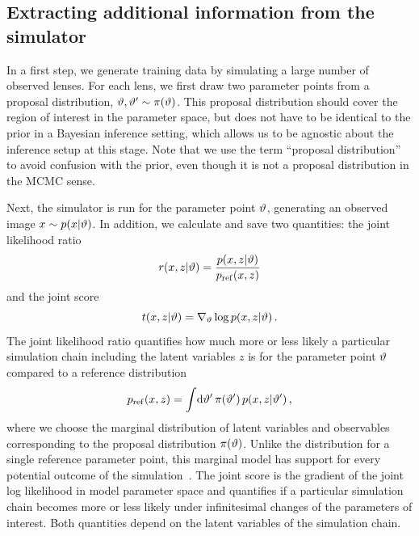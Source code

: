 \documentclass[twocolumn]{aastex63}
\begin{document}
\subsection{Extracting additional information from the simulator}
\label{sec:lfi-gold}

In a first step, we generate training data by simulating a large number of observed lenses. For each lens, we first draw two parameter points from a proposal distribution, $\vartheta, \vartheta' \sim \pi(\vartheta)$. This proposal distribution should cover the region of interest in the parameter space, but does not have to be identical to the prior in a Bayesian inference setting, which allows us to be agnostic about the inference setup at this stage. Note that we use the term ``proposal distribution'' to avoid confusion with the prior, even though it is not a proposal distribution in the MCMC sense.

Next, the simulator is run for the parameter point $\vartheta$, generating an observed image $x \sim p(x|\vartheta)$. In addition, we calculate and save two quantities: the joint likelihood ratio
%
\begin{equation}
  r(x,z | \stattheta) = \frac {p(x,z | \stattheta)} {p_\mathrm{ref}(x,z)}
\end{equation}
%
and the joint score
%
\begin{equation}
  t(x, z | \stattheta) = \nabla_{\stattheta} \log p(x,z | \stattheta) \,.
\end{equation}
%
The joint likelihood ratio quantifies how much more or less likely a particular simulation chain including the latent variables $z$ is for the parameter point $\vartheta$ compared to a reference distribution
%
\begin{equation}
  \pref(x,z) = \int\!\diff\stattheta' \, \pi(\stattheta') \, p(x,z | \stattheta') \,,
\end{equation}
%
where we choose the marginal distribution of latent variables and observables corresponding to the proposal distribution $\pi(\vartheta)$. Unlike the distribution for a single reference parameter point, this marginal model has support for every potential outcome of the simulation~\citep{Hermans:2019ioj}. The joint score is the gradient of the joint log likelihood in model parameter space and quantifies if a particular simulation chain becomes more or less likely under infinitesimal changes of the parameters of interest. Both quantities depend on the latent variables of the simulation chain.
\end{document}
